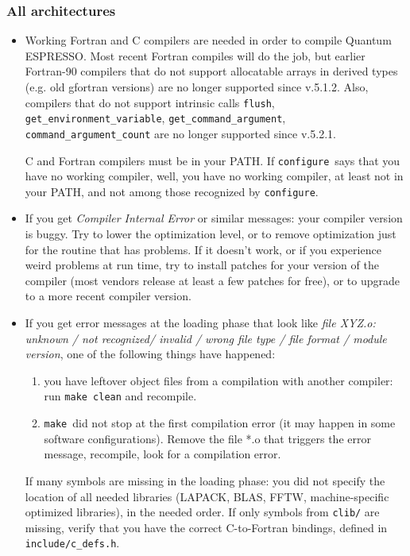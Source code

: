\documentclass[12pt,a4paper]{article}
\def\qe{{\sc Quantum ESPRESSO}}
\def\configure{\texttt{configure}}
\def\make{\texttt{make}}
\begin{document}
\subsubsection{All architectures}
\begin{itemize}
\item
Working Fortran and C compilers are needed in order
to compile \qe. Most recent Fortran compiles will do
the job, but earlier Fortran-90 compilers that do not
support allocatable arrays in derived types (e.g. old
gfortran versions) are no longer supported since v.5.1.2.
Also, compilers that do not support intrinsic calls
\texttt{flush}, \texttt{get\_environment\_variable},
\texttt{get\_command\_argument}, \texttt{command\_argument\_count}
are no longer supported since v.5.2.1.

C and Fortran compilers must be in your PATH.
If \configure\ says that you have no working compiler, well,
you have no working compiler, at least not in your PATH, and
not among those recognized by \configure.
\item
If you get {\em Compiler Internal Error} or similar messages: your
compiler version is buggy. Try to lower the optimization level, or to
remove optimization just for the routine that has problems. If it
doesn't work, or if you experience weird problems at run time, try to
install patches for your version of the compiler (most vendors release
at least a few patches for free), or to upgrade to a more recent
compiler version.
\item
If you get error messages at the loading phase that look like
{\em file XYZ.o: unknown / not recognized/ invalid / wrong
file type / file format / module version},
one of the following things have happened:
\begin{enumerate}
\item you have leftover object files from a compilation with another
  compiler: run \texttt{make clean} and recompile.
\item \make\ did not stop at the first compilation error (it may
happen in some software configurations). Remove the file *.o
that triggers the error message, recompile, look for a
compilation error.
\end{enumerate}
If many symbols are missing in the loading phase: you did not specify the
location of all needed libraries (LAPACK, BLAS, FFTW, machine-specific
optimized libraries), in the needed order.
If only symbols from \texttt{clib/} are missing, verify that
you have the correct C-to-Fortran bindings, defined in
\texttt{include/c\_defs.h}.

\end{itemize}
\end{document}
